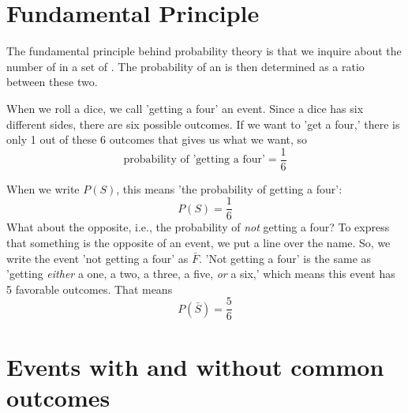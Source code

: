 




\section{Fundamental Principle}
The fundamental principle behind probability theory is that we inquire about the number of  in a set of . The probability of an  is then determined as a ratio between these two.\os
	
\vsk

When we roll a dice, we call 'getting a four' an event. Since a dice has six different sides, there are six possible outcomes.
If we want to 'get a four,' there is only 1 out of these 6 outcomes that gives us what we want, so
\[\text{probability of 'getting a four'}=\frac{1}{6} \]
\qquad {} \vsk

When we write $P(S)$, this means 'the probability of getting a four':
\[ P(S)=\frac{1}{6} \]
What about the opposite, i.e., the probability of \textsl{not} getting a four? To express that something is the opposite of an event, we put a line over the name. So, we write the event 'not getting a four' as $ \bar{F} $. 'Not getting a four' is the same as 'getting \textsl{either} a one, a two, a three, a five, \textsl{or} a six,' which means this event has 5 favorable outcomes. That means
\[ P(\bar{S})=\frac{5}{6} \]
\section{Events with and without common outcomes}
